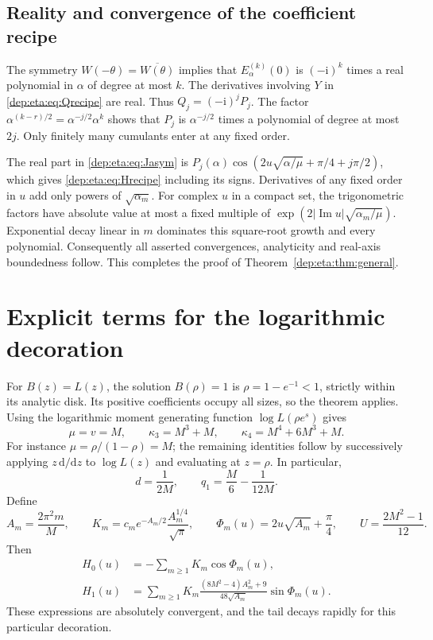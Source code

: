 \documentclass[11pt]{article}
\theoremstyle{definition}\newtheorem{definition}[theorem]{Definition}
\theoremstyle{remark}\newtheorem{remark}[theorem]{Remark}
\newcommand{\ii}{\mathrm i}
\DeclareMathOperator{\Ima}{Im}
\begin{document}
\subsection{Reality and convergence of the coefficient recipe}
The symmetry $W(-\theta)=\overline{W(\theta)}$ implies that
$E_\alpha^{(k)}(0)$ is $(-\ii)^k$ times a real polynomial in
$\alpha$ of degree at most $k$. The derivatives involving $Y$ in
\eqref{dep:eta:eq:Qrecipe} are real. Thus $Q_j=(-\ii)^jP_j$. The factor
$\alpha^{(k-r)/2}=\alpha^{-j/2}\alpha^k$ shows that $P_j$ is
$\alpha^{-j/2}$ times a polynomial of degree at most $2j$.
Only finitely many cumulants enter at any fixed order.

The real part in \eqref{dep:eta:eq:Jasym} is
$P_j(\alpha)\cos(2u\sqrt{\alpha/\mu}+\pi/4+j\pi/2)$,
which gives \eqref{dep:eta:eq:Hrecipe} including its signs. Derivatives of
any fixed order in $u$ add only powers of $\sqrt{\alpha_m}$.
For complex $u$ in a compact set, the trigonometric factors have
absolute value at most a fixed multiple of
$\exp(2|\Ima u|\sqrt{\alpha_m/\mu})$. Exponential decay linear in
$m$ dominates this square-root growth and every polynomial.
Consequently all asserted convergences, analyticity and real-axis
boundedness follow. This completes the proof of
Theorem~\ref{dep:eta:thm:general}.

\section{Explicit terms for the logarithmic decoration}\label{dep:eta:sec:three}
For $B(z)=L(z)$, the solution $B(\rho)=1$ is
$\rho=1-e^{-1}<1$, strictly within its analytic disk. Its positive
coefficients occupy all sizes, so the theorem applies.
Using the logarithmic moment generating function
$\log L(\rho e^s)$ gives
\begin{equation}\label{dep:eta:eq:cumulants}
 \mu=v=M,\qquad
 \kappa_3=M^3+M,\qquad \kappa_4=M^4+6M^3+M.
\end{equation}
For instance $\mu=\rho/(1-\rho)=M$; the remaining identities follow
by successively applying $z\,\mathrm d/\mathrm dz$ to
$\log L(z)$ and evaluating at $z=\rho$. In particular,
\begin{equation}\label{dep:eta:eq:dqlog}
 d=\frac1{2M},\qquad q_1=\frac M6-\frac1{12M}.
\end{equation}
Define
\begin{equation}\label{dep:eta:eq:AKphi}
 A_m=\frac{2\pi^2m}{M},\qquad
 K_m=c_me^{-A_m/2}\frac{A_m^{1/4}}{\sqrt\pi},\qquad
 \Phi_m(u)=2u\sqrt{A_m}+\frac\pi4,
 \qquad U=\frac{2M^2-1}{12}.
\end{equation}
Then
\begin{align}
 H_0(u)&=-\sum_{m\ge1}K_m\cos\Phi_m(u),\label{dep:eta:eq:H0log}\\
 H_1(u)&=\sum_{m\ge1}K_m
     \frac{(8M^2-4)A_m^2+9}{48\sqrt{A_m}}\sin\Phi_m(u).
 \label{dep:eta:eq:H1log}
\end{align}
These expressions are absolutely convergent, and the tail decays
rapidly for this particular decoration.
\end{document}
